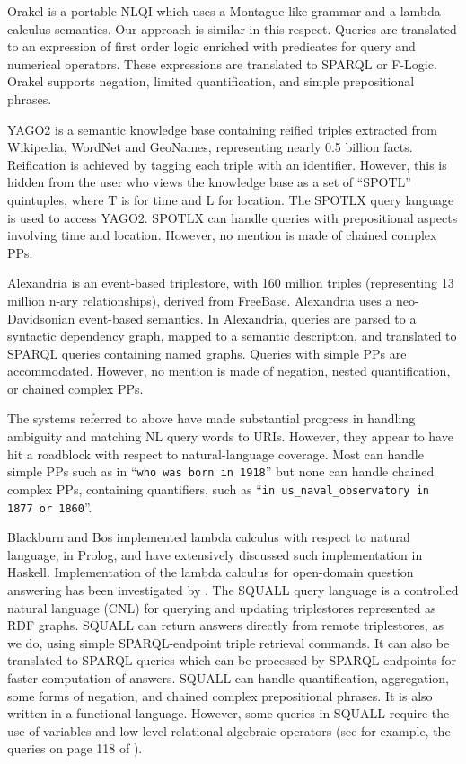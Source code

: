 \documentclass[../main.tex]{subfiles}
\begin{document}
\begin{refsection}
Orakel \cite{cimiano2007orakel} is a portable NLQI which uses a Montague-like grammar and a lambda calculus semantics. Our approach is similar in this respect. Queries are translated to an expression of first order logic enriched with predicates for query and numerical operators. These
expressions are translated to SPARQL or F-Logic. Orakel supports negation, limited quantification, and simple prepositional phrases.

YAGO2 \cite{hoffart2013yago2} is a semantic knowledge base containing reified triples extracted from Wikipedia, WordNet and GeoNames, representing nearly 0.5 billion facts. Reification is achieved by tagging each triple with an identifier. However, this is hidden from the user who views the knowledge base as a set of ``SPOTL'' quintuples, where T is for time and L for location. The SPOTLX query language is used to access YAGO2. SPOTLX can handle queries with prepositional aspects involving time and location. However, no mention is made of chained complex PPs.

Alexandria \cite{wendt2012linguistic} is an event-based triplestore, with 160 million triples (representing 13 million n-ary relationships), derived from FreeBase. Alexandria uses a neo-Davidsonian \cite{parsons1990events} event-based semantics. In Alexandria, queries are parsed to a syntactic dependency graph, mapped to a semantic description, and translated to SPARQL queries containing named graphs. Queries with simple PPs are accommodated. However, no mention is made of negation, nested quantification, or chained complex PPs.

The systems referred to above have made substantial progress in handling ambiguity and matching NL query words to URIs. However, they appear to have hit a roadblock with respect to natural-language coverage. Most can handle simple PPs such as in ``\texttt{who was born in 1918}'' but none can handle chained complex PPs, containing quantifiers, such as ``\texttt{in us\_naval\_observatory in 1877 or 1860}''.

Blackburn and Bos \cite{blackburn2005representation} implemented lambda calculus with respect to natural language, in
Prolog, and \cite{van2010computational} have extensively discussed such implementation in
Haskell. Implementation of the lambda calculus for open-domain question answering has been
investigated by \cite{ahn2005question}.
The SQUALL query language \cite{ferre:squall,ferre2013squall} is a controlled natural language
(CNL) for querying and updating triplestores represented as RDF graphs. SQUALL can return
answers directly from remote triplestores, as we do, using simple SPARQL-endpoint triple
retrieval commands. It can also be translated to SPARQL queries which can be processed by
SPARQL endpoints for faster computation of answers. SQUALL can handle
quantification, aggregation, some forms of negation, and chained complex prepositional phrases.
It is also written in a functional language. However, some queries in SQUALL require the use of
variables and low-level relational algebraic operators (see for example, the queries on page 118
of \cite{ferre2013squall}).


\end{refsection}
\end{document}
